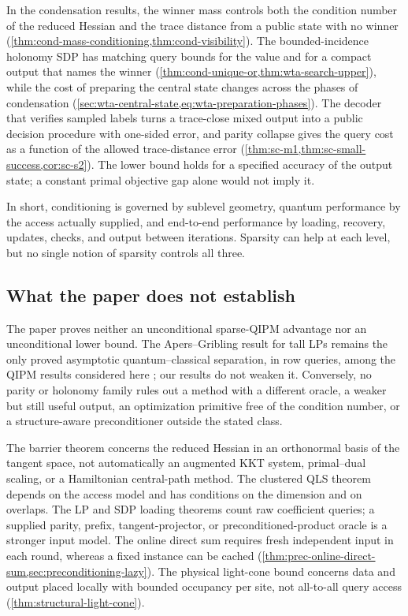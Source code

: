 In the condensation results, the winner mass controls both the condition
number of the reduced Hessian and the trace
distance from a public state with no winner
(\cref{thm:cond-mass-conditioning,thm:cond-visibility}).  The bounded-incidence
holonomy SDP has matching query bounds for the value and for a compact
output that names the winner (\cref{thm:cond-unique-or,thm:wta-search-upper}),
while the cost of preparing the central state changes across the phases of
condensation (\cref{sec:wta-central-state,eq:wta-preparation-phases}).  The
decoder that verifies sampled labels turns a trace-close mixed output into a
public decision procedure with one-sided error, and parity collapse gives
the query cost as a function of the allowed trace-distance error
(\cref{thm:sc-m1,thm:sc-small-success,cor:sc-s2}).  The lower bound holds for
a specified accuracy of the output state; a constant primal objective gap
alone would not imply it.

In short, conditioning is governed by sublevel geometry, quantum
performance by the access actually supplied, and end-to-end performance by
loading, recovery, updates, checks, and output between iterations.  Sparsity
can help at each level, but no single notion of sparsity controls all
three.

\subsection{What the paper does not establish}
\label{sec:discussion-nonclaims}

The paper proves neither an unconditional sparse-QIPM advantage nor an
unconditional lower bound.  The Apers--Gribling result for tall LPs remains
the only proved asymptotic quantum--classical separation, in row queries,
among the QIPM results considered here
\cite{apers2026-quantum-speedups-linear-programming-interior}; our results do
not weaken it.  Conversely, no parity or holonomy family rules out a method
with a different oracle, a weaker but still useful output, an
optimization primitive free of the condition number, or a structure-aware
preconditioner outside the stated class.

The barrier theorem concerns the reduced Hessian in an orthonormal basis of
the tangent space, not automatically an augmented KKT system, primal--dual
scaling, or a Hamiltonian central-path method.  The clustered QLS theorem
depends on the access model and has conditions on the dimension and on
overlaps.  The LP and SDP loading theorems count raw
coefficient queries; a supplied parity, prefix, tangent-projector, or
preconditioned-product oracle is a stronger input model.  The online direct
sum requires fresh independent input in each round, whereas a fixed instance
can be cached (\cref{thm:prec-online-direct-sum,sec:preconditioning-lazy}).
The physical light-cone bound concerns data and output placed locally with
bounded occupancy per site, not all-to-all query access
(\cref{thm:structural-light-cone}).

